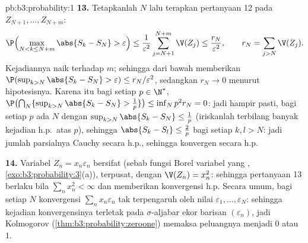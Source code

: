 \begin{solution}{pb:b3:probability:1}
\textbf{13.} Tetapkanlah $N$ lalu terapkan pertanyaan 12 pada $Z_{N+1},
\dots, Z_{N+m}$:
\[
\P\Bigl(\max_{N < k \leq N+m}\abs{S_k - S_N} >
\varepsilon\Bigr) \leq
\frac1{\varepsilon^2}\sum_{j=N+1}^{N+m}\V(Z_j) \leq
\frac{r_N}{\varepsilon^2},
\qquad r_N = \sum_{j>N}\V(Z_j) .
\]
Kejadiannya naik terhadap $m$; sehingga  dari bawah memberikan
$\P(\sup_{k>N}\abs{S_k - S_N} > \varepsilon) \leq
r_N/\varepsilon^2$, sedangkan $r_N \to 0$ menurut hipotesisnya. Karena itu
bagi setiap $p \in \N^*$, $\P\bigl(\bigcap_N\{\sup_{k>N}
\abs{S_k - S_N} > \frac1p\}\bigr) \leq \inf_Np^2r_N = 0$:
jadi hampir pasti, bagi setiap $p$ ada $N$ dengan
$\sup_{k>N}\abs{S_k - S_N} \leq \frac1p$ (iriskanlah
terbilang banyak kejadian h.p.\ atas $p$), sehingga $\abs{S_k -
S_l} \leq \frac2p$ bagi setiap $k, l > N$: jadi jumlah parsialnya
Cauchy secara h.p., sehingga konvergen secara h.p.

\textbf{14.} Variabel $Z_n = x_n\varepsilon_n$ bersifat
 (sebab fungsi Borel variabel yang ,
\cref{exo:b3:probability:3}(a)), terpusat, dengan $\V(Z_n) =
x_n^2$: sehingga pertanyaan 13 berlaku bila $\sum_nx_n^2 < \infty$ dan
memberikan konvergensi h.p. Secara umum, bagi setiap $N$
konvergensi $\sum_nx_n\varepsilon_n$ tak terpengaruh oleh
nilai $\varepsilon_1, \dots, \varepsilon_N$: sehingga
kejadian konvergensinya terletak pada $\sigma$-aljabar ekor
barisan  $(\varepsilon_n)$, jadi  Kolmogorov
(\cref{thm:b3:probability:zeroone}) memaksa
peluangnya menjadi $0$ atau $1$.


\end{solution}
